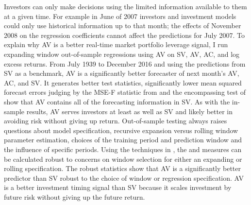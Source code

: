 Investors can only make decisions using the limited information available to them at a given time. For example in June of 2007 investors and investment models could only use historical information up to that month; the effects of November 2008 on the regression coefficients cannot affect the predictions for July 2007. %
To explain why AV is a better real-time market portfolio leverage signal, I run expanding window out-of-sample regressions using AV on SV, AV, AC, and log excess returns. From July 1939 to December 2016 and using the predictions from SV as a benchmark, AV is a significantly better forecaster of next month’s AV, AC, and SV. It generates better \citet{Diebold1995} test statistics, significantly lower mean squared forecast errors judging by the MSE-F statistic from \citet{mccracken_asymptotics_2007} and the encompassing test of \citet{harvey_tests_1998} show that AV contains all of the forecasting information in SV. As with the in-sample results, AV serves investors at least as well as SV and likely better in avoiding risk without giving up return. Out-of-sample testing always raises questions about model specification, recursive expansion versus rolling window parameter estimation, choices of the training period and prediction window and the influence of specific periods. Using the techniques in \citet{rossi_out--sample_2012}, the \citet{Diebold1995} and \citet{harvey_tests_1998} measures can be calculated robust to concerns on window selection for either an expanding or rolling specification.
The \citet{rossi_out--sample_2012}  robust statistics show that AV is a significantly better predictor than SV robust to the choice of window or regression specification. %
AV is a better investment timing signal than SV because it scales investment by future risk without giving up the future return.

